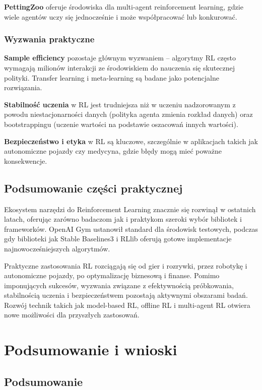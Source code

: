\documentclass[12pt,a4paper]{article}
\begin{document}
\textbf{PettingZoo} oferuje środowiska dla multi-agent reinforcement learning, gdzie wiele agentów uczy się jednocześnie i może współpracować lub konkurować.

\subsubsection{Wyzwania praktyczne}

\textbf{Sample efficiency} pozostaje głównym wyzwaniem -- algorytmy RL często wymagają milionów interakcji ze środowiskiem do nauczenia się skutecznej polityki. Transfer learning i meta-learning są badane jako potencjalne rozwiązania.

\textbf{Stabilność uczenia} w RL jest trudniejsza niż w uczeniu nadzorowanym z powodu niestacjonarności danych (polityka agenta zmienia rozkład danych) oraz bootstrappingu (uczenie wartości na podstawie oszacowań innych wartości).

\textbf{Bezpieczeństwo i etyka} w RL są kluczowe, szczególnie w aplikacjach takich jak autonomiczne pojazdy czy medycyna, gdzie błędy mogą mieć poważne konsekwencje.

\subsection{Podsumowanie części praktycznej}

Ekosystem narzędzi do Reinforcement Learning znacznie się rozwinął w ostatnich latach, oferując zarówno badaczom jak i praktykom szeroki wybór bibliotek i frameworków. OpenAI Gym ustanowił standard dla środowisk testowych, podczas gdy biblioteki jak Stable Baselines3 i RLlib oferują gotowe implementacje najnowocześniejszych algorytmów.

Praktyczne zastosowania RL rozciągają się od gier i rozrywki, przez robotykę i autonomiczne pojazdy, po optymalizację biznesową i finanse. Pomimo imponujących sukcesów, wyzwania związane z efektywnością próbkowania, stabilnością uczenia i bezpieczeństwem pozostają aktywnymi obszarami badań. Rozwój technik takich jak model-based RL, offline RL i multi-agent RL otwiera nowe możliwości dla przyszłych zastosowań.

\newpage

\section{Podsumowanie i wnioski}

\subsection{Podsumowanie}
\end{document}
